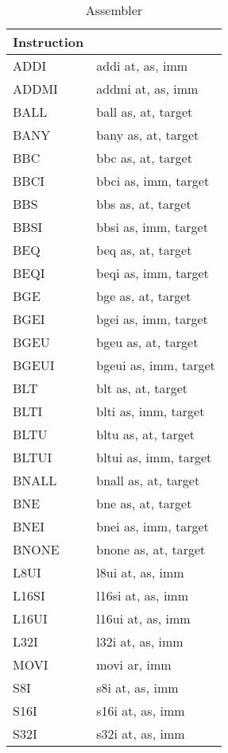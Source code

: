 	\begin{longtable}{|p{5cm}|p{5cm}|}
		\caption{Assembler\label{long}}\\
		\hline
		Instruction & \\
		\hline
		ADDI & addi at, as, imm\\ \hline
		ADDMI & addmi at, as, imm\\ \hline
		BALL & ball as, at, target\\ \hline
		BANY & bany as, at, target\\ \hline
		BBC & bbc as, at, target\\ \hline
		BBCI & bbci as, imm, target\\ \hline
		BBS & bbs as, at, target\\ \hline
		BBSI & bbsi as, imm, target\\ \hline
		BEQ & beq as, at, target\\ \hline
		BEQI & beqi as, imm, target\\ \hline
		BGE & bge as, at, target\\ \hline
		BGEI & bgei as, imm, target\\ \hline
		BGEU & bgeu as, at, target\\ \hline
		BGEUI & bgeui as, imm, target\\ \hline
		BLT & blt as, at, target\\ \hline
		BLTI & blti as, imm, target\\ \hline
		BLTU & bltu as, at, target\\ \hline
		BLTUI & bltui as, imm, target\\ \hline
		BNALL & bnall as, at, target\\ \hline
		BNE & bne as, at, target\\ \hline
		BNEI & bnei as, imm, target\\ \hline
		BNONE & bnone as, at, target\\ \hline
		L8UI & l8ui at, as, imm\\ \hline
		L16SI & l16si at, as, imm\\ \hline
		L16UI & l16ui at, as, imm\\ \hline
		L32I & l32i at, as, imm\\ \hline
		MOVI & movi ar, imm\\ \hline
		S8I & s8i at, as, imm\\ \hline
		S16I & s16i at, as, imm\\ \hline
		S32I & s32i at, as, imm\\ \hline
	\end{longtable}
